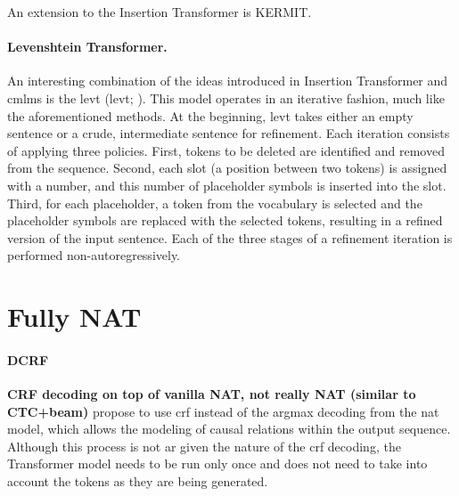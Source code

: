 An extension to the Insertion Transformer is
KERMIT. \citep{chan-etal-2019-kermit} 


\paragraph{Levenshtein Transformer.} An interesting combination of the ideas
introduced in Insertion Transformer and \acp{cmlm} is the \acl{levt}
(\acs{levt}; \citealp{gu-etal-2019-levenshtein}). This model
operates in an iterative fashion, much like the aforementioned methods. At the
beginning, \ac{levt} takes either an empty sentence or a crude, intermediate
sentence for refinement. Each iteration consists of applying three
policies. First, tokens to be deleted are identified and removed from the
sequence. Second, each slot (a position between two tokens) is assigned with a
number, and this number of placeholder symbols is inserted into the slot.
Third, for each placeholder, a token from the vocabulary is selected and the
placeholder symbols are replaced with the selected tokens, resulting in a
refined version of the input sentence.  Each of the three stages of a
refinement iteration is performed non-autoregressively.





\section{Fully NAT}%
\label{sec:nat:misc}


\paragraph{DCRF} \textbf{CRF decoding on top of vanilla NAT, not really NAT
  (similar to CTC+beam)} \citet{sun2019fast} propose to use \ac{crf} instead of
the argmax decoding from the \ac{nat} model, which allows the modeling of
causal relations within the output sequence. Although this process is not
\acl{ar} given the nature of the \ac{crf} decoding, the Transformer model needs
to be run only once and does not need to take into account the tokens as they
are being generated.

